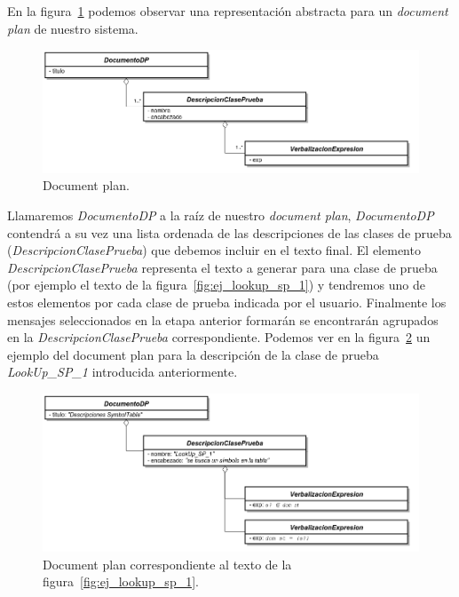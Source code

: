 En la figura~\ref{fig:png_document_plan} podemos observar una representación abstracta para un \emph{document plan} de nuestro sistema.

\begin{figure}[H]
  	\centering
	\includegraphics[scale=0.4]{img/document_plan.png}
	\caption{Document plan.}
  	\label{fig:png_document_plan}
\end{figure}

Llamaremos \emph{DocumentoDP} a la raíz de nuestro \emph{document plan}, \emph{DocumentoDP} contendrá a su vez una lista ordenada de las descripciones de las clases de prueba (\emph{DescripcionClasePrueba}) que debemos incluir en el texto final. El elemento \emph{DescripcionClasePrueba} representa el texto a generar para una clase de prueba (por ejemplo el texto de la figura~\ref{fig:ej_lookup_sp_1}) y tendremos uno de estos elementos por cada clase de prueba indicada por el usuario. Finalmente los mensajes seleccionados en la etapa anterior formarán se encontrarán agrupados en la \emph{DescripcionClasePrueba} correspondiente. Podemos ver en la figura~\ref{fig:png_document_plan_ej} un ejemplo del document plan para la descripción de la clase de prueba \emph{LookUp\_SP\_1} introducida anteriormente. 

\begin{figure}[H]
  	\centering
	\includegraphics[scale=0.4]{img/document_plan_ej.png}
	\caption{Document plan correspondiente al texto de la figura~\ref{fig:ej_lookup_sp_1}.}
  	\label{fig:png_document_plan_ej}
\end{figure}


